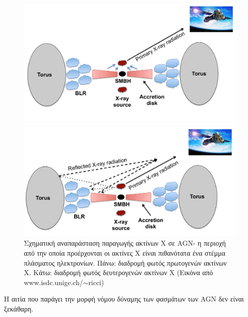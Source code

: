 \begin{figure}
 \begin{center}
 \includegraphics[width=0.7\linewidth]{Figures/X_ray_primary_1.jpg}
 
 \includegraphics[width=0.7\linewidth]{Figures/X_ray_refl_1.jpg}
 \caption{Σχηματική αναπαράσταση παραγωγής ακτίνων Χ σε \textlatin{AGN}- η περιοχή από την οποία προέρχονται οι ακτίνες Χ είναι πιθανότατα ένα στέμμα πλάσματος ηλεκτρονίων. Πάνω: διαδρομή φωτός πρωτογενών ακτίνων Χ. Κάτω: διαδρομή φωτός δευτερογενών ακτίνων Χ (Εικόνα από \textlatin{www.isdc.unige.ch/$\sim$ricci})} \label{fig:xray_primary}
 \end{center}
\end{figure}
Η αιτία που παράγει την μορφή νόμου δύναμης των φασμάτων των \textlatin{AGN} δεν είναι ξεκάθαρη. 

